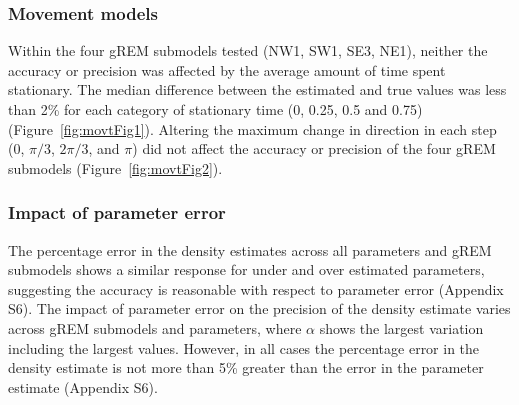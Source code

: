 
\subsubsection{Movement models}

Within the four gREM submodels tested (NW1, SW1, SE3, NE1), neither the accuracy or precision was affected by the average amount of time spent stationary.
The median difference between the estimated and true values was less than 2\% for each category of stationary time (0, 0.25, 0.5 and 0.75) (Figure~\ref{fig:movtFig1}).
Altering the maximum change in direction in each step (0, $\pi/3$, $2\pi/3$, and $\pi$) did not affect the accuracy or precision of the four gREM submodels (Figure~\ref{fig:movtFig2}). 

\subsubsection{Impact of parameter error}

The percentage error in the density estimates across all parameters and gREM submodels shows a similar response for under and over estimated parameters, suggesting the accuracy is reasonable with respect to parameter error (Appendix S6).
The impact of parameter error on the precision of the density estimate varies across gREM submodels and parameters, where $\alpha$ shows the largest variation including the largest values.
However, in all cases the percentage error in the density estimate is not more than 5\% greater than the error in the parameter estimate (Appendix S6).



